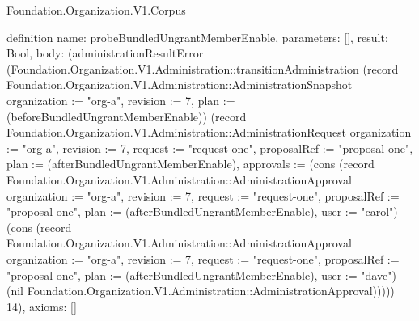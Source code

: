 \begin{lexlean}{Foundation.Organization.V1.Corpus}
\begin{semanticmodule}
definition{
  name: probeBundledUngrantMemberEnable,
  parameters: [],
  result: Bool,
  body: (administrationResultError (Foundation.Organization.V1.Administration::transitionAdministration (record Foundation.Organization.V1.Administration::AdministrationSnapshot {organization := "org-a", revision := 7, plan := (beforeBundledUngrantMemberEnable)}) (record Foundation.Organization.V1.Administration::AdministrationRequest {organization := "org-a", revision := 7, request := "request-one", proposalRef := "proposal-one", plan := (afterBundledUngrantMemberEnable), approvals := (cons (record Foundation.Organization.V1.Administration::AdministrationApproval {organization := "org-a", revision := 7, request := "request-one", proposalRef := "proposal-one", plan := (afterBundledUngrantMemberEnable), user := "carol"}) (cons (record Foundation.Organization.V1.Administration::AdministrationApproval {organization := "org-a", revision := 7, request := "request-one", proposalRef := "proposal-one", plan := (afterBundledUngrantMemberEnable), user := "dave"}) (nil Foundation.Organization.V1.Administration::AdministrationApproval)))})) 14),
  axioms: []
}


\end{semanticmodule}
\end{lexlean}
